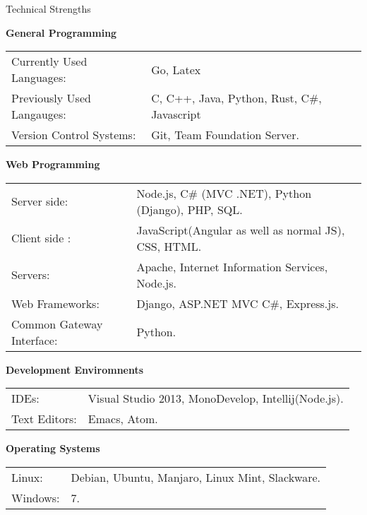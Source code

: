 \documentclass{resume} %
\newcommand{\btab}[2]{
	\bgroup
	\def\arraystretch{#1}
	\begin{tabular}{#2}
}
\newcommand{\etab}{
	\end{tabular} \smallskip
	\egroup
}
\begin{document}
\begin{rSection}{Technical Strengths}

{\bf General Programming}

\btab{1.1}{ l l }
	Currently Used Languages: & Go, Latex \\
	Previously Used Langauges: & C, C++, Java, Python, Rust, C\#, Javascript \\
	Version Control Systems: & Git, Team Foundation Server. \\
\etab

{\bf Web Programming}

\btab{1.1}{ l l }
	Server side: & Node.js, C\# (MVC .NET), Python (Django), PHP, SQL. \\
	Client side : & JavaScript(Angular as well as normal JS), CSS, HTML. \\
	Servers: & Apache, Internet Information Services, Node.js. \\
	Web Frameworks: & Django, ASP.NET MVC C\#, Express.js. \\
	Common Gateway Interface: & Python. \\
\etab

{\bf Development Enviromnents}

\btab{1.1}{ l l }
	IDEs: & Visual Studio 2013, MonoDevelop, Intellij(Node.js). \\
	Text Editors: & Emacs, Atom. \\
\etab

{\bf Operating Systems}

\btab{1.1}{ l l }
	Linux: & Debian, Ubuntu, Manjaro, Linux Mint, Slackware. \\
	Windows: & 7. \\
\etab

\end{rSection}
\end{document}
